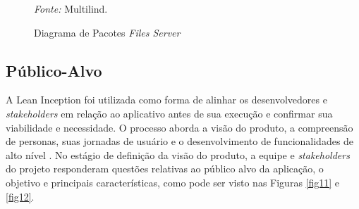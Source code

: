 \begin{figure}[h!]
	\centering
	\caption{Diagrama de Pacotes \textit{Files Server}}
	\begin{tablenotes}[flushleft]
		\centering
		\item \textit{Fonte:} Multilind.
	\end{tablenotes}
	\label{fig10}
\end{figure}

\subsection{Público-Alvo}
\label{Publico-Alvo}
A Lean Inception foi utilizada como forma de alinhar os desenvolvedores e \textit{stakeholders} em relação ao aplicativo antes de sua execução e confirmar sua viabilidade e necessidade. O processo aborda a visão do produto, a compreensão de personas, suas jornadas de usuário e 
o desenvolvimento de funcionalidades de alto nível \cite{lean}. No estágio de definição da visão do produto, a equipe e \textit{stakeholders} do projeto responderam questões relativas ao público alvo da aplicação, o objetivo e principais características, como pode ser visto nas 
Figuras \ref{fig11} e \ref{fig12}. 

